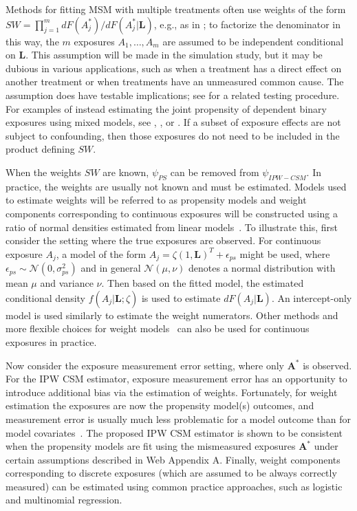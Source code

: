 \documentclass[useAMS,usenatbib,referee]{biom}
\begin{document}
Methods for fitting MSM with multiple treatments often use weights of the form $SW = \prod_{j=1}^{m} dF(A^{*}_{j}) / dF(A^{*}_{j} | \bm{L})$, e.g., as in \citet{hernan2001}; to factorize the denominator in this way, the $m$ exposures $A_{1}, \ldots, A_{m}$ are assumed to be independent conditional on $\bm{L}$. This assumption will be made in the simulation study, but it may be dubious in various applications, such as when a treatment has a direct effect on another treatment or when treatments have an unmeasured common cause. The assumption does have testable implications; see \citet{zhang2012} for a related testing procedure. For examples of instead estimating the joint propensity of dependent binary exposures using mixed models, see \citet{tchetgen2012}, \citet{perez2014}, or \citet*{liu2016}. If a subset of exposure effects are not subject to confounding, then those exposures do not need to be included in the product defining $SW$.

When the weights $SW$ are known, $\psi_{PS}$ can be removed from $\psi_{IPW-CSM}$. In practice, the weights are usually not known and must be estimated. Models used to estimate weights will be referred to as propensity models and weight components corresponding to continuous exposures will be constructed using a ratio of normal densities estimated from linear models~\citep{hirano2004}. To illustrate this, first consider the setting where the true exposures are observed. For continuous exposure $A_{j}$, a model of the form $A_{j} = \zeta (1, \bm{L})^{T} + \epsilon_{ps}$ might be used, where $\epsilon_{ps} \sim \mathcal{N}(0, \sigma^{2}_{ps})$ and in general $\mathcal{N}(\mu, \nu)$ denotes a normal distribution with mean $\mu$ and variance $\nu$. Then based on the fitted model, the estimated conditional density $f(A_{j} | \bm{L}; \hat{\zeta})$ is used to estimate $dF(A_{j} | \bm{L})$. An intercept-only model is used similarly to estimate the weight numerators. Other methods and more flexible choices for weight models~\citep{naimi2014} can also be used for continuous exposures in practice.

Now consider the exposure measurement error setting, where only $\bm{A}^{*}$ is observed. For the IPW CSM estimator, exposure measurement error has an opportunity to introduce additional bias via the estimation of weights. Fortunately, for weight estimation the exposures are now the propensity model(s) outcomes, and measurement error is usually much less problematic for a model outcome than for model covariates~\citep{carroll2006}. The proposed IPW CSM estimator is shown to be consistent when the propensity models are fit using the mismeasured exposures $\bm{A}^{*}$ under certain assumptions described in Web Appendix A. Finally, weight components corresponding to discrete exposures (which are assumed to be always correctly measured) can be estimated using common practice approaches, such as logistic and multinomial regression.
\end{document}
